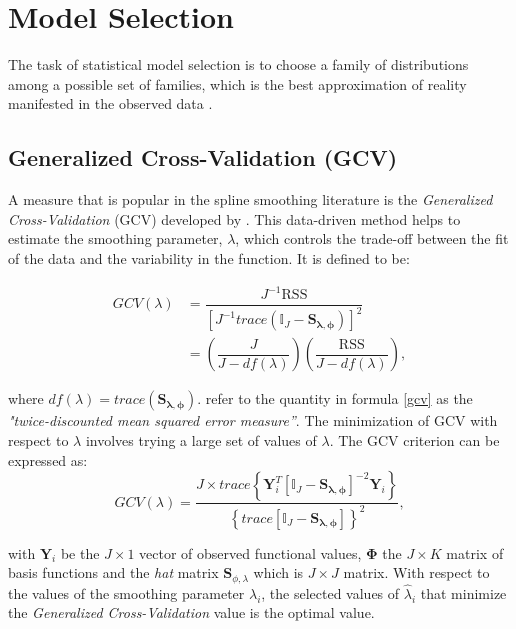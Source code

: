 \FloatBarrier
\section{Model Selection}\label{section:model_selection}
The task of statistical model selection is to choose a family of distributions among a possible set of families, which is the best approximation of reality manifested in the observed data \citep{Rao2001}.

\subsection{Generalized Cross-Validation (GCV)}\label{GCV}

A measure that is popular in the spline smoothing literature is the \textit{Generalized Cross-Validation }(GCV) developed by \cite{Craven1979}. This data-driven method helps to estimate the smoothing parameter, $\lambda$, which controls the trade-off between the fit of the data and the variability in the function. It is defined to be:

\begin{align}\label{gcv}
GCV(\lambda)&=\dfrac{J^{-1}\text{RSS}}{\left[J^{-1}trace(\mathbb{I}_{J}-\bm{S_{\lambda,\phi}})\right]^{2}} \nonumber \\
            &=\left(\dfrac{J}{J-df(\lambda)}\right)\left(\dfrac{\text{RSS}}{J-df(\lambda)}\right),
\end{align}

where $df(\lambda)=trace(\mathbf{S_{\lambda,\phi}})$. \cite{olberd:ramsay} refer to the quantity in formula \eqref{gcv} as the \textit{"twice-discounted mean squared error measure''}. The minimization of GCV with respect to $\lambda$ involves trying a large set of values of $\lambda$. The GCV criterion can be expressed as:
\begin{equation}
GCV(\lambda)=\dfrac{J\times trace\left\{\bm{Y}^T_i\left[\mathbb{I}_{J}-\bm{S_{\lambda,\phi}}\right]^{-2}\bm{Y}_i\right\}}{\left\{trace\left[\mathbb{I}_{J}-\bm{S_{\lambda,\phi}}\right]\right\}^{2}},
\end{equation}

with $\mathbf{Y}_i$ be the $J \times 1$ vector of observed functional values, $\mathbf{\Phi}$ the $J \times K$ matrix of basis functions and the \textit{hat} matrix $\bm{S}_{\phi,\lambda}$ which is $J \times J$ matrix. With respect to the values of the smoothing parameter $\lambda_i$, the selected values of $\hat{\lambda}_i$ that minimize the \textit{Generalized Cross-Validation} value is the optimal value.\\
\clearpage
